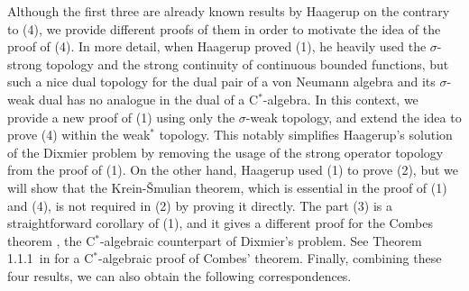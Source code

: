 \documentclass[noamsfonts,a4paper,10pt]{amsart}
\theoremstyle{plain}
\theoremstyle{definition}
\begin{document}
Although the first three are already known results by Haagerup on the contrary to (4), we provide different proofs of them in order to motivate the idea of the proof of (4).
In more detail, when Haagerup proved (1), he heavily used the $\sigma$-strong topology and the strong continuity of continuous bounded functions, but such a nice dual topology for the dual pair of a von Neumann algebra and its $\sigma$-weak dual has no analogue in the dual of a C$^*$-algebra.
In this context, we provide a new proof of (1) using only the $\sigma$-weak topology, and extend the idea to prove (4) within the weak$^*$ topology.
This notably simplifies Haagerup's solution of the Dixmier problem by removing the usage of the strong operator topology from the proof of (1).
On the other hand, Haagerup used (1) to prove (2), but we will show that the Krein-\v Smulian theorem, which is essential in the proof of (1) and (4), is not required in (2) by proving it directly.
The part (3) is a straightforward corollary of (1), and it gives a different proof for the Combes theorem \cite{MR236721}, the C$^*$-algebraic counterpart of Dixmier's problem.
See Theorem 1.1.1~in \cite{MR4864224} for a C$^*$-algebraic proof of Combes' theorem.
Finally, combining these four results, we can also obtain the following correspondences.
\end{document}
